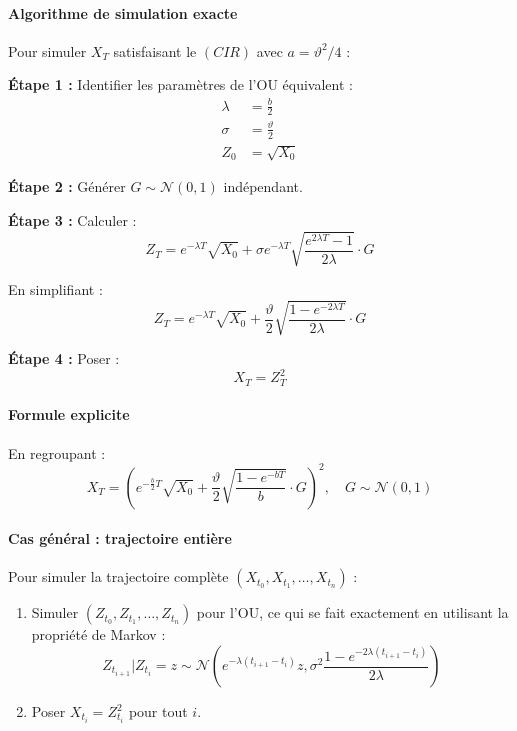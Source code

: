 \documentclass[12pt,a4paper]{article}
\theoremstyle{definition}
\theoremstyle{remark}
\begin{document}
\paragraph{Algorithme de simulation exacte}

Pour simuler $X_T$ satisfaisant le $(CIR)$ avec $a = \vartheta^2/4$ :

\textbf{Étape 1 :} Identifier les paramètres de l'OU équivalent :
\begin{align*}
\lambda &= \frac{b}{2} \\
\sigma &= \frac{\vartheta}{2} \\
Z_0 &= \sqrt{X_0}
\end{align*}

\textbf{Étape 2 :} Générer $G \sim \mathcal{N}(0,1)$ indépendant.

\textbf{Étape 3 :} Calculer :
\[
Z_T = e^{-\lambda T}\sqrt{X_0} + \sigma e^{-\lambda T}\sqrt{\frac{e^{2\lambda T} - 1}{2\lambda}} \cdot G
\]

En simplifiant :
\[
Z_T = e^{-\lambda T}\sqrt{X_0} + \frac{\vartheta}{2}\sqrt{\frac{1 - e^{-2\lambda T}}{2\lambda}} \cdot G
\]

\textbf{Étape 4 :} Poser :
\[
X_T = Z_T^2
\]

\paragraph{Formule explicite}

En regroupant :
\begin{equation}
\boxed{
X_T = \left(e^{-\frac{b}{2}T}\sqrt{X_0} + \frac{\vartheta}{2}\sqrt{\frac{1 - e^{-bT}}{b}} \cdot G\right)^2, \quad G \sim \mathcal{N}(0,1)
}
\end{equation}

\paragraph{Cas général : trajectoire entière}

Pour simuler la trajectoire complète $(X_{t_0}, X_{t_1}, \ldots, X_{t_n})$ :

\begin{enumerate}
\item Simuler $(Z_{t_0}, Z_{t_1}, \ldots, Z_{t_n})$ pour l'OU, ce qui se fait exactement en utilisant la propriété de Markov :
\[
Z_{t_{i+1}} | Z_{t_i} = z \sim \mathcal{N}\left(e^{-\lambda(t_{i+1}-t_i)}z, \sigma^2\frac{1 - e^{-2\lambda(t_{i+1}-t_i)}}{2\lambda}\right)
\]

\item Poser $X_{t_i} = Z_{t_i}^2$ pour tout $i$.
\end{enumerate}
\end{document}

